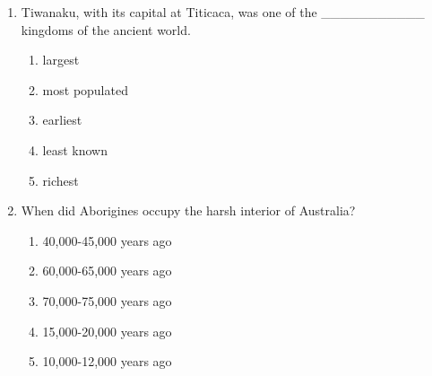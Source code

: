 \documentclass[12pt]{article}
\begin{document}
\begin{enumerate}[label=\arabic*.]
\begin{enumerate}[label=(\alph*)]
\end{enumerate}
\item Tiwanaku, with its capital at Titicaca, was one of the \_\_\_\_\_\_\_\_\_\_\_ kingdoms of the ancient world.
\begin{enumerate}[label=(\alph*)]
    \item largest
    \item most populated
    \item earliest
    \item least known
    \item richest
\end{enumerate}
\item When did Aborigines occupy the harsh interior of Australia?
\begin{enumerate}[label=(\alph*)]
    \item 40,000-45,000 years ago
    \item 60,000-65,000 years ago
    \item 70,000-75,000 years ago
    \item 15,000-20,000 years ago
    \item 10,000-12,000 years ago
\end{enumerate}
\end{enumerate}
\end{document}
